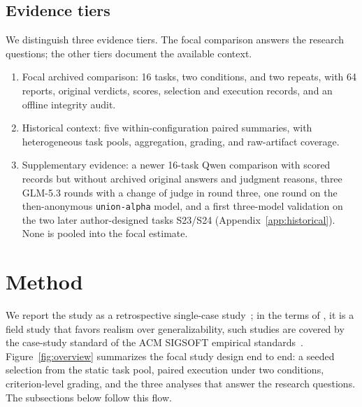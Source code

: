 \documentclass[11pt]{article}
\begin{document}
\subsection{Evidence tiers}
We distinguish three evidence tiers. The focal comparison answers the research questions; the other tiers document the available context.
\begin{enumerate}
\item Focal archived comparison: 16 tasks, two conditions, and two repeats, with 64 reports, original verdicts, scores, selection and execution records, and an offline integrity audit.
\item Historical context: five within-configuration paired summaries, with heterogeneous task pools, aggregation, grading, and raw-artifact coverage.
\item Supplementary evidence: a newer 16-task Qwen comparison with scored records but without archived original answers and judgment reasons, three GLM-5.3 rounds with a change of judge in round three, one round on the then-anonymous \texttt{union-alpha} model, and a first three-model validation on the two later author-designed tasks S23/S24 (Appendix~\ref{app:historical}). None is pooled into the focal estimate.
\end{enumerate}

\section{Method}\label{sec:method}
We report the study as a retrospective single-case study~\citep{runeson2009case}; in the terms of \citet{stol2018abc}, it is a field study that favors realism over generalizability, such studies are covered by the case-study standard of the ACM SIGSOFT empirical standards~\citep{ralph2020empirical}. Figure~\ref{fig:overview} summarizes the focal study design end to end: a seeded selection from the static task pool, paired execution under two conditions, criterion-level grading, and the three analyses that answer the research questions. The subsections below follow this flow.
\end{document}
